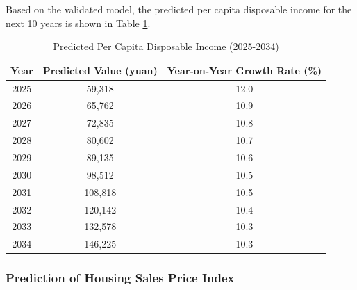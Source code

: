 \documentclass{mcmthesis}
\begin{document}
Based on the validated model, the predicted per capita disposable income for the next 10 years is shown in Table \ref{tab:prediction}.

\begin{table}[h!]
    \centering
    \renewcommand{\arraystretch}{1.2}
    \begin{tabular}{c c c}
        \toprule
        Year & Predicted Value (yuan) & Year-on-Year Growth Rate (\%) \\
        \midrule
        2025 & 59,318 & 12.0 \\
        2026 & 65,762 & 10.9 \\
        2027 & 72,835 & 10.8 \\
        2028 & 80,602 & 10.7 \\
        2029 & 89,135 & 10.6 \\
        2030 & 98,512 & 10.5 \\
        2031 & 108,818 & 10.5 \\
        2032 & 120,142 & 10.4 \\
        2033 & 132,578 & 10.3 \\
        2034 & 146,225 & 10.3 \\
        \bottomrule
    \end{tabular}
    \caption{Predicted Per Capita Disposable Income (2025-2034)}
    \label{tab:prediction}
\end{table}

\subsubsection{Prediction of Housing Sales Price Index} %



\end{document}
